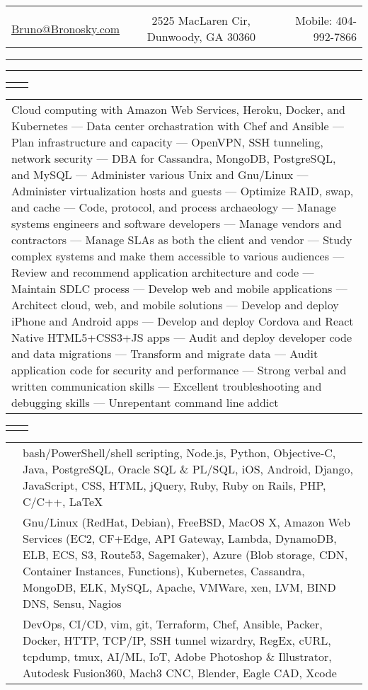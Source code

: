 \documentclass[letterpaper,10pt]{article}
\newcommand{\lineDouble}[0]{\hrule\vspace{2pt}\hrule\vspace{1.5pt}}
\newcommand{\sizeE}[0]{\fontsize{10pt}{12pt}\selectfont}
\newcommand{\sizeF}[0]{\fontsize{11pt}{13pt}\selectfont}
\newcommand{\heading}[4]{
    \begin{tabularx}{\textwidth}{LCR}
        &\huge{\textbf{\sc{#1}}}&\\
        \href{mailto:#2}{#2} & #3 & Mobile: #4\\
    \end{tabularx}
    \lineDouble
    \vspace{5pt}%
}
\newcounter{skipfirstcounter}
\newcommand{\blocktitle}[1]{
    \setcounter{skipfirstcounter}{0}
    \begin{tabularx}{\textwidth}{lR}
        {\sizeF\sc{#1}} & \noindent\hrulefill\\
    \end{tabularx}
}
\newcommand{\blockOverview}[1]{%
    \blocktitle{Overview}%
    \vspace{0.4mm}%
    \begin{tabular*}{\textwidth}{p{\textwidth}}%
        #1%
    \end{tabular*}%
    \vspace{2mm}%
}%
\newcommand{\blockSkills}[1]{
    \blocktitle{Skills}
    \begin{tabular*}{\textwidth}{p{22mm}p{171.6mm}}%
        #1%
    \end{tabular*}%
    \vspace{2.4mm}%
}
\newcommand{\skillgroup}[2]{{\sizeE{#1}} & #2\\\addlinespace[1.6mm]}
\newcommand{\skillgrouplast}[2]{{\sizeE{#1}} & #2\\}
\begin{document}
\heading{Bruno Bronosky}
{Bruno@Bronosky.com}
{2525 MacLaren Cir, Dunwoody, GA 30360}
{404-992-7866}

\blockOverview{
    Cloud computing with Amazon Web Services, Heroku, Docker, and Kubernetes ---
    Data center orchastration with Chef and Ansible ---
    Plan infrastructure and capacity ---
    OpenVPN, SSH tunneling, network security ---
    DBA for Cassandra, MongoDB, PostgreSQL, and MySQL ---
    Administer various Unix and Gnu/Linux ---
    Administer virtualization hosts and guests ---
    Optimize RAID, swap, and cache ---
    Code, protocol, and process archaeology ---
    Manage systems engineers and software developers ---
    Manage vendors and contractors ---
    Manage SLAs as both the client and vendor ---
    Study complex systems and make them accessible to various audiences ---
    Review and recommend application architecture and code ---
    Maintain SDLC process ---
    Develop web and mobile applications ---
    Architect cloud, web, and mobile solutions ---
    Develop and deploy iPhone and Android apps ---
    Develop and deploy Cordova and React Native HTML5+CSS3+JS apps ---
    Audit and deploy developer code and data migrations ---
    Transform and migrate data ---
    Audit application code for security and performance ---
    Strong verbal and written communication skills ---
    Excellent troubleshooting and debugging skills ---
    Unrepentant command line addict
}

\blockSkills{
    \skillgroup{Development}{
        bash/PowerShell/shell scripting,
        Node.js,
        Python,
        Objective-C,
        Java,
        PostgreSQL,
        Oracle SQL \& PL/SQL,
        iOS,
        Android,
        Django,
        JavaScript,
        CSS,
        HTML,
        jQuery,
        Ruby,
        Ruby on Rails,
        PHP,
        C/C++,
        \LaTeX
    }

    \skillgroup{Operations}{
        Gnu/Linux (RedHat, Debian),
        FreeBSD,
        MacOS X,
        Amazon Web Services (EC2, CF+Edge, API Gateway, Lambda, DynamoDB, ELB, ECS, S3, Route53, Sagemaker),
        Azure (Blob storage, CDN, Container Instances, Functions),
        Kubernetes,
        Cassandra,
        MongoDB,
        ELK,
        MySQL,
        Apache,
        VMWare,
        xen,
        LVM,
        BIND DNS,
        Sensu,
        Nagios
    }

    \skillgrouplast{Concepts}{
        DevOps,
        CI/CD,
        vim,
        git,
        Terraform,
        Chef,
        Ansible,
        Packer,
        Docker,
        HTTP,
        TCP/IP,
        SSH tunnel wizardry,
        RegEx,
        cURL,
        tcpdump,
        tmux,
        AI/ML,
        IoT,
        Adobe Photoshop \& Illustrator,
        Autodesk Fusion360,
        Mach3 CNC,
        Blender,
        Eagle CAD,
        Xcode
    }
}
\end{document}
